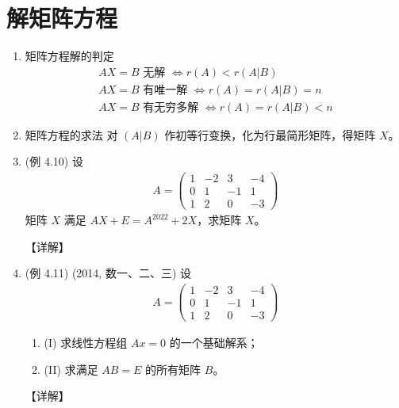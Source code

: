 \documentclass[12pt, a4paper, oneside, UTF8]{ctexbook}
\begin{document}
\section{解矩阵方程}

\begin{enumerate}[label=\arabic*.,start=9]
    \item 矩阵方程解的判定
    \begin{align*}
    AX = B \text{ 无解 } \Leftrightarrow r(A) < r(A|B) \\
    AX = B \text{ 有唯一解 } \Leftrightarrow r(A) = r(A|B) = n \\
    AX = B \text{ 有无穷多解 } \Leftrightarrow r(A) = r(A|B) < n
    \end{align*}
    
    \item 矩阵方程的求法
    对 $(A|B)$ 作初等行变换，化为行最简形矩阵，得矩阵 $X$。
    
    \item (例 4.10) 设 
    \begin{align*}
    A = \begin{pmatrix}
    1 & -2 & 3 & -4 \\
    0 & 1 & -1 & 1 \\
    1 & 2 & 0 & -3
    \end{pmatrix}
    \end{align*}
    矩阵 $X$ 满足 $AX + E = A^{2022} + 2X$，求矩阵 $X$。
    
    \begin{solution}
    【详解】
    \end{solution}
    
    \item (例 4.11) (2014, 数一、二、三) 设 
    \begin{align*}
    A = \begin{pmatrix}
    1 & -2 & 3 & -4 \\
    0 & 1 & -1 & 1 \\
    1 & 2 & 0 & -3
    \end{pmatrix}
    \end{align*}
    \begin{enumerate}
        \item (I) 求线性方程组 $Ax = 0$ 的一个基础解系；
        \item (II) 求满足 $AB = E$ 的所有矩阵 $B$。
    \end{enumerate}
    
    \begin{solution}
    【详解】
    \end{solution}
\end{enumerate}
\end{document}
